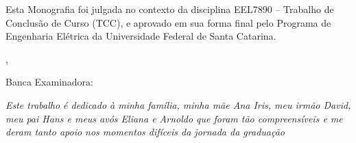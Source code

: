 \documentclass[a5paper,english,spanish,brazil]{ufsc-thesis}
\begin{document}
\begin{folhadeaprovacao}

  \begin{center}
    {\imprimirautor}

    \vspace*{\fill}\vspace*{\fill}
    \begin{center}
      \ABNTEXchapterfont\bfseries\Large\imprimirtitulo
    \end{center}
    \vspace*{\fill}
    
    
    	\begin{center}
    		\vspace*{0.5cm}
    		Esta Monografia foi julgada no contexto da disciplina EEL7890 -- Trabalho de Conclusão de Curso (TCC), e aprovado em sua forma final pelo Programa de Engenharia Elétrica da Universidade Federal de Santa Catarina.
    		\vspace*{0.5cm}
  		\end{center}
    
    \vspace*{\fill}
   \end{center}
  
  \begin{center}
    {\large\imprimirlocal},
    {\large\imprimirdata}
  \end{center}
        
   Banca Examinadora:
      

\end{folhadeaprovacao}

\begin{dedicatoria}
   \vspace*{\fill}
   \centering
   \noindent
   \textit{Este trabalho é dedicado à minha família, minha mãe Ana Iris, meu irmão David, meu pai Hans e meus avós Eliana e Arnoldo que foram tão compreensíveis e me deram tanto apoio nos momentos difíceis da jornada da graduação} \vspace*{\fill}
\end{dedicatoria}
\end{document}
